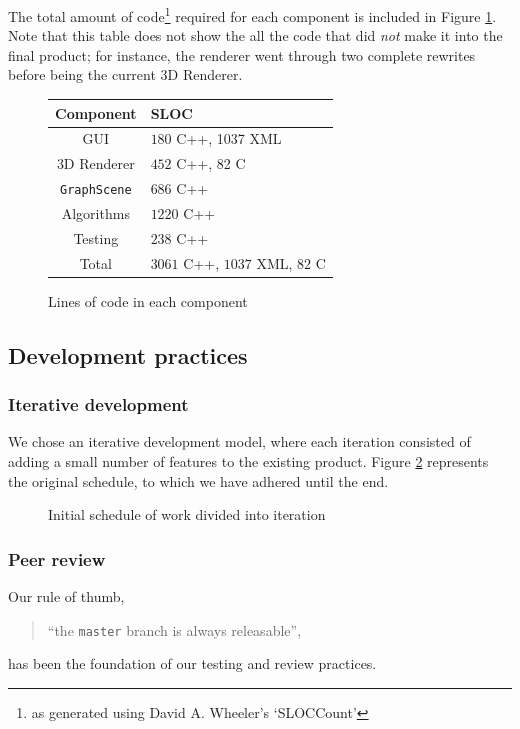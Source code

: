 \documentclass[a4paper,11pt,titlepage]{article}
\newcommand{\code}[1]{\texttt{#1}}
\newcommand{\master}{\code{master} }
\begin{document}
The total amount of code\footnote{as generated using David
  A. Wheeler's `SLOCCount'} required for each component is included in
Figure \ref{fig:sloc}. Note that this table does not show the all the
code that did \emph{not} make it into the final product; for instance,
the renderer went through two complete rewrites before being the
current 3D Renderer.

\begin{figure}[h]
  \centering
  \begin{tabular}{c|l}
    Component         & SLOC \\
    \hline
    GUI               & $180$ C++, 1037 XML\\
    3D Renderer       & $452$ C++, 82 C\\
    \code{GraphScene} & $686$ C++\\
    Algorithms        & $1220$ C++\\
    Testing           & $238$ C++ \\
    \hline
    Total             & $3061$ C++, $1037$ XML, $82$ C
  \end{tabular}
  \caption{Lines of code in each component}
  \label{fig:sloc}
\end{figure}

\subsection{Development practices}
\label{practices}

\subsubsection{Iterative development}

We chose an iterative development model, where each iteration
consisted of adding a small number of features to the existing
product.  Figure \ref{fig:iterations} represents the original
schedule, to which we have adhered until the end.

\begin{figure}
  \centering
  
  \caption{Initial schedule of work divided into iteration}
  \label{fig:iterations}
\end{figure}

\subsubsection{Peer review}
Our rule of thumb,
\begin{quote}
  ``the \master branch is always releasable'',
\end{quote}
has been the foundation of our testing and review practices.
\end{document}
